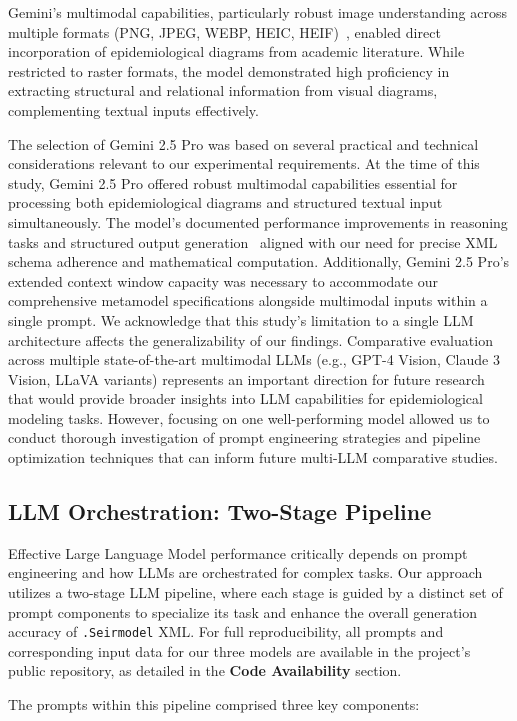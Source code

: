 \documentclass[conference]{IEEEtran}
\begin{document}
Gemini's multimodal capabilities, particularly robust image understanding across multiple formats (PNG, JPEG, WEBP, HEIC, HEIF)~\cite{b6}, enabled direct incorporation of epidemiological diagrams from academic literature. While restricted to raster formats, the model demonstrated high proficiency in extracting structural and relational information from visual diagrams, complementing textual inputs effectively.

The selection of Gemini 2.5 Pro was based on several practical and technical considerations relevant to our experimental requirements. At the time of this study, Gemini 2.5 Pro offered robust multimodal capabilities essential for processing both epidemiological diagrams and structured textual input simultaneously. The model's documented performance improvements in reasoning tasks and structured output generation~\cite{b5} aligned with our need for precise XML schema adherence and mathematical computation. Additionally, Gemini 2.5 Pro's extended context window capacity was necessary to accommodate our comprehensive metamodel specifications alongside multimodal inputs within a single prompt. We acknowledge that this study's limitation to a single LLM architecture affects the generalizability of our findings. Comparative evaluation across multiple state-of-the-art multimodal LLMs (e.g., GPT-4 Vision, Claude 3 Vision, LLaVA variants) represents an important direction for future research that would provide broader insights into LLM capabilities for epidemiological modeling tasks. However, focusing on one well-performing model allowed us to conduct thorough investigation of prompt engineering strategies and pipeline optimization techniques that can inform future multi-LLM comparative studies.

\subsection{LLM Orchestration: Two-Stage Pipeline}
Effective Large Language Model performance critically depends on prompt engineering and how LLMs are orchestrated for complex tasks. Our approach utilizes a two-stage LLM pipeline, where each stage is guided by a distinct set of prompt components to specialize its task and enhance the overall generation accuracy of \texttt{.Seirmodel} XML. For full reproducibility, all prompts and corresponding input data for our three models are available in the project's public repository, as detailed in the \textbf{Code Availability} section.

The prompts within this pipeline comprised three key components:
\end{document}
